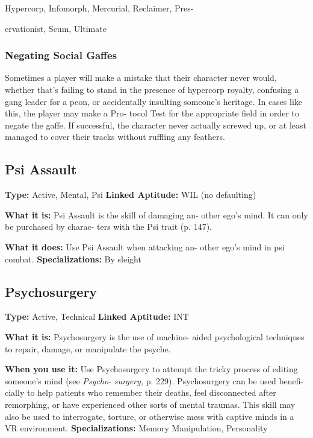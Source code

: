 Hypercorp, Infomorph, Mercurial, Reclaimer, Pres-

ervationist, Scum, Ultimate

\subsubsection{Negating Social Gaffes}

Sometimes a player will make a mistake that their 
character never would, whether that's failing to stand 
in the presence of hypercorp royalty, confusing a gang 
leader for a peon, or accidentally insulting someone's 
heritage. In cases like this, the player may make a Pro-
tocol Test for the appropriate field in order to negate 
the gaffe. If successful, the character never actually 
screwed up, or at least managed to cover their tracks 
without ruffling any feathers.

\subsection{Psi Assault}

\textbf{Type:} Active, Mental, Psi
\textbf{Linked Aptitude:} WIL (no defaulting)

\textbf{What it is:} Psi Assault is the skill of damaging an-
other ego's mind. It can only be purchased by charac-
ters with the Psi trait (p. 147).

\textbf{What it does:} Use Psi Assault when attacking an-
other ego's mind in psi combat.
\textbf{Specializations:} By sleight

\subsection{Psychosurgery}

\textbf{Type:} Active, Technical
\textbf{Linked Aptitude:} INT

\textbf{What it is:} Psychosurgery is the use of machine-
aided psychological techniques to repair, damage, or 
manipulate the psyche.

\textbf{When you use it:} Use Psychosurgery to attempt the 
tricky process of editing someone's mind (see \textit{Psycho-}
\textit{surgery,} p. 229). Psychosurgery can be used benefi-
cially to help patients who remember their deaths, feel 
disconnected after remorphing, or have experienced 
other sorts of mental traumas. This skill may also be 
used to interrogate, torture, or otherwise mess with 
captive minds in a VR environment.
\textbf{Specializations:} Memory Manipulation, Personality 


